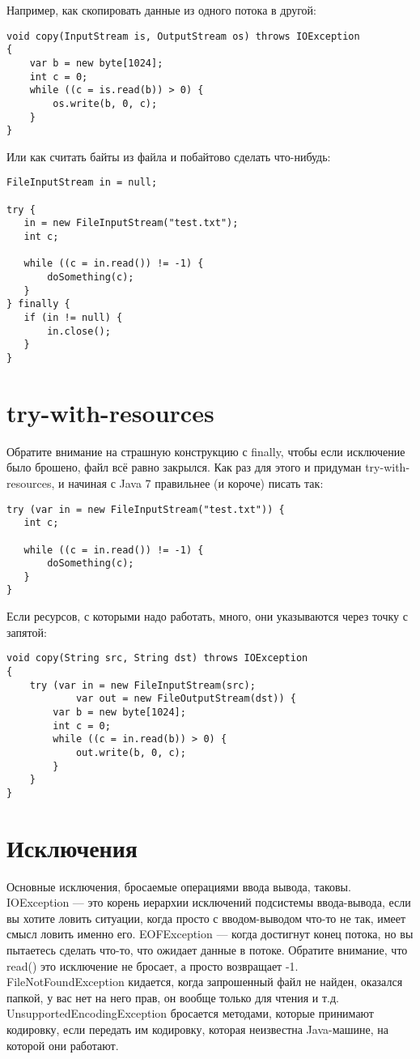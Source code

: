 \documentclass[a5paper]{article}
\begin{document}
Например, как скопировать данные из одного потока в другой:

\begin{verbatim}
void copy(InputStream is, OutputStream os) throws IOException
{
    var b = new byte[1024];
    int c = 0;
    while ((c = is.read(b)) > 0) {
        os.write(b, 0, c);
    }
}
\end{verbatim}

Или как считать байты из файла и побайтово сделать что-нибудь:

\begin{verbatim}
FileInputStream in = null;

try {
   in = new FileInputStream("test.txt");
   int c;

   while ((c = in.read()) != -1) {
       doSomething(c);
   }
} finally {
   if (in != null) {
       in.close();
   }
}
\end{verbatim}

\section{try-with-resources}

Обратите внимание на страшную конструкцию с finally, чтобы если исключение было брошено, файл всё равно закрылся. Как раз для этого и придуман try-with-resources, и начиная с Java 7 правильнее (и короче) писать так:

\begin{verbatim}
try (var in = new FileInputStream("test.txt")) {
   int c;

   while ((c = in.read()) != -1) {
       doSomething(c);
   }
}
\end{verbatim}

Если ресурсов, с которыми надо работать, много, они указываются через точку с запятой:

\begin{verbatim}
void copy(String src, String dst) throws IOException
{
    try (var in = new FileInputStream(src);
            var out = new FileOutputStream(dst)) {
        var b = new byte[1024];
        int c = 0;
        while ((c = in.read(b)) > 0) {
            out.write(b, 0, c);
        }
    }
}
\end{verbatim}

\section{Исключения}

Основные исключения, бросаемые операциями ввода вывода, таковы. IOException --- это корень иерархии исключений подсистемы ввода-вывода, если вы хотите ловить ситуации, когда просто с вводом-выводом что-то не так, имеет смысл ловить именно его. EOFException --- когда достигнут конец потока, но вы пытаетесь сделать что-то, что ожидает данные в потоке. Обратите внимание, что read() это исключение не бросает, а просто возвращает -1. FileNotFoundException кидается, когда запрошенный файл не найден, оказался папкой, у вас нет на него прав, он вообще только для чтения и т.д. UnsupportedEncodingException бросается методами, которые принимают кодировку, если передать им кодировку, которая неизвестна Java-машине, на которой они работают.
\end{document}
